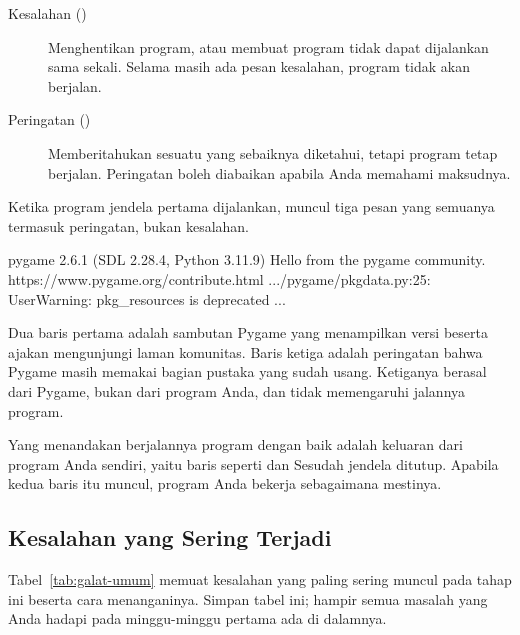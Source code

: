 \begin{description}
  \item[Kesalahan ()] Menghentikan program, atau membuat
        program tidak dapat dijalankan sama sekali. Selama masih ada pesan
        kesalahan, program tidak akan berjalan.
  \item[Peringatan ()] Memberitahukan sesuatu yang sebaiknya
        diketahui, tetapi program tetap berjalan. Peringatan boleh diabaikan
        apabila Anda memahami maksudnya.
\end{description}

Ketika program jendela pertama dijalankan, muncul tiga pesan yang semuanya
termasuk peringatan, bukan kesalahan.

\begin{kodekeluaran}
pygame 2.6.1 (SDL 2.28.4, Python 3.11.9)
Hello from the pygame community. https://www.pygame.org/contribute.html
.../pygame/pkgdata.py:25: UserWarning: pkg_resources is deprecated ...
\end{kodekeluaran}

Dua baris pertama adalah sambutan Pygame yang menampilkan versi beserta ajakan
mengunjungi laman komunitas. Baris ketiga adalah peringatan bahwa Pygame masih
memakai bagian pustaka yang sudah usang. Ketiganya berasal dari Pygame, bukan
dari program Anda, dan tidak memengaruhi jalannya program.

Yang menandakan berjalannya program dengan baik adalah keluaran dari program
Anda sendiri, yaitu baris seperti  dan
 Sesudah jendela ditutup. Apabila kedua baris itu
muncul, program Anda bekerja sebagaimana mestinya.

\subsection{Kesalahan yang Sering Terjadi}

Tabel~\ref{tab:galat-umum} memuat kesalahan yang paling sering muncul pada
tahap ini beserta cara menanganinya. Simpan tabel ini; hampir semua masalah
yang Anda hadapi pada minggu-minggu pertama ada di dalamnya.

